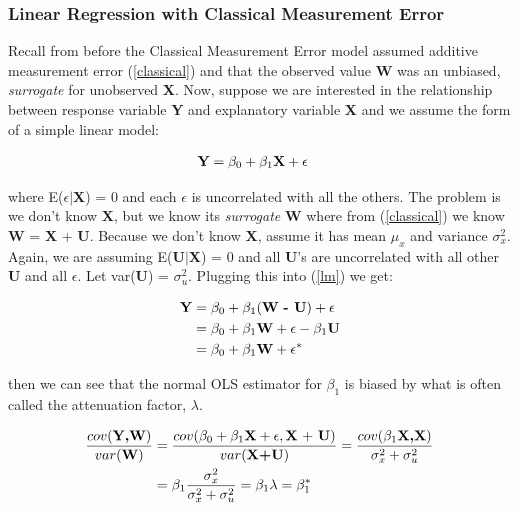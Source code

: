 \documentclass[11pt]{article}\usepackage[]{graphicx}\usepackage[]{color}
\begin{document}
\subsubsection{Linear Regression with Classical Measurement Error}

Recall from before the Classical Measurement Error model assumed additive measurement error (\ref{classical}) and that the observed value {\bf W} was an unbiased, \emph{surrogate} for unobserved {\bf X}.  Now, suppose we are interested in the relationship between response variable {\bf Y} and explanatory variable {\bf X} and we assume the form of a  simple linear model:

\begin{align}
	\text{{\bf Y}} &= \beta_0 + \beta_1 \text{{\bf X}} + \epsilon
	\label{lm}
\end{align}

where E($\epsilon|${\bf X}) = 0 and each $\epsilon$ is uncorrelated with all the others. The problem is we don't know {\bf X}, but we know its \emph{surrogate} {\bf W} where from (\ref{classical}) we know {\bf W} = {\bf X} + {\bf U}. Because we don't know {\bf X}, assume it has mean $\mu_x$ and variance $\sigma_x^2$. Again, we are assuming E({\bf U$|$X}) = 0 and all {\bf U}'s are uncorrelated with all other {\bf U} and all $\epsilon$. Let var({\bf U}) = $\sigma_u^2$. Plugging this into (\ref{lm}) we get:

\begin{align}
	{\bf Y} &= \beta_0 + \beta_1 (\text{{\bf W} {\bf- U}}) + \epsilon \\
	&= \beta_0  + \beta_1{\bf W} + \epsilon - \beta_1 \text{{\bf U}} \\
	&= \beta_0 + \beta_1 {\bf W} + \epsilon^*
	\label{lmderive}
\end{align}

then we can see that the normal OLS estimator for $\beta_1$ is biased by what is often called the attenuation factor, $\lambda$. 

\begin{align}
	 \frac{cov(\text{{\bf Y,W}})}{var(\text{{\bf W}})} &= \frac{cov(\beta_0 + \beta_1 \text{{\bf X}} + \epsilon, \text{{\bf X} + {\bf U}})}{var(\text{{\bf X+U}})} = \frac{cov(\beta_1\text{{\bf X,X}})}{\sigma_x^2 + \sigma_u^2} \\
	&= \beta_1 \frac{\sigma_x^2}{\sigma_x^2 + \sigma_u^2} = \beta_1 \lambda = \beta_1^*
	\label{lmbias}
\end{align}
\end{document}
